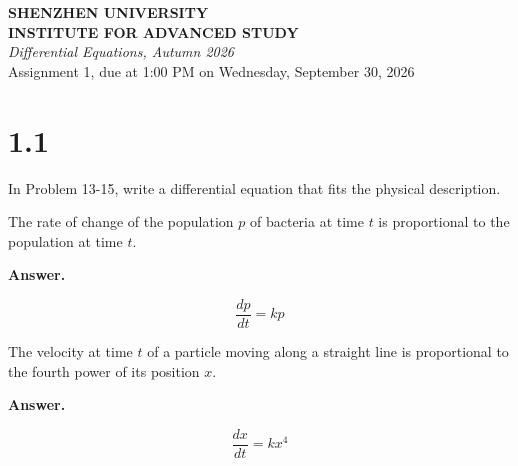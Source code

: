 \documentclass[12pt]{article}
\newenvironment{Answer}{%
  \par\medskip\noindent
  \begin{list}{}{%
    \setlength{\leftmargin}{0pt}%
    \setlength{\itemindent}{0pt}%
    \setlength{\listparindent}{0pt}%
  }%
  \item\relax
  \textbf{Answer.}\quad\ignorespaces
}{%
  \end{list}
  \par\medskip
}
\begin{document}
\begin{center}
    {\Large\bfseries SHENZHEN UNIVERSITY} \\[0.3em]
    {\large\bfseries INSTITUTE FOR ADVANCED STUDY} \\[0.8em]
    \textit{Differential Equations, Autumn 2026} \\
    Assignment 1, due at 1:00 PM on Wednesday, September 30, 2026
\end{center}

\vspace{1.5em}

\section*{1.1}
In Problem 13-15, write a differential equation that fits the physical description.
\begin{enumerate}[label=\textbf{\arabic*.}]
  \item[13.] The rate of change of the population $p$ of bacteria at time $t$ is proportional to the population at time $t$.
  \begin{Answer}
  \begin{equation*}
    \displaystyle \frac{dp}{dt} = kp
  \end{equation*}
  \end{Answer}

  \item[14.] The velocity at time $t$ of a particle moving along a straight line is proportional to the fourth power of its position $x$.
  \begin{Answer}
  \begin{equation*}
    \displaystyle \frac{dx}{dt} = kx^4
  \end{equation*}
  \end{Answer}
\end{enumerate}
\end{document}
